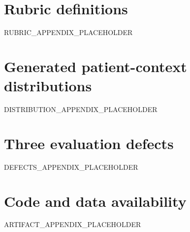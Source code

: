 \documentclass[11pt]{article}
\begin{document}
\section{Rubric definitions}
\label{app:rubrics}
RUBRIC_APPENDIX_PLACEHOLDER

\section{Generated patient-context distributions}
\label{app:distributions}
DISTRIBUTION_APPENDIX_PLACEHOLDER

\section{Three evaluation defects}
\label{app:defects}
DEFECTS_APPENDIX_PLACEHOLDER

\section{Code and data availability}
\label{app:artifacts}
ARTIFACT_APPENDIX_PLACEHOLDER
\end{document}
